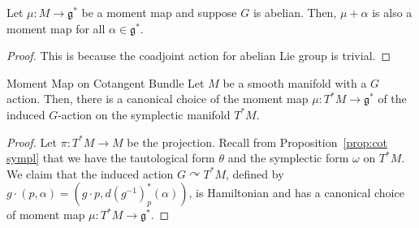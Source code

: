 \documentclass[b5paper,final]{article}
\newcommand{\acton}{\curvearrowright}
\begin{document}
\begin{lemma}{}
    Let $\mu : M \to \mathfrak{g}^*$ be a moment map and suppose $G$ is abelian. Then, $\mu + \alpha$ is also a moment map for all $\alpha \in \mathfrak{g}^*$.
    \begin{proof}
        This is because the coadjoint action for abelian Lie group is trivial.
    \end{proof}
\end{lemma}

\begin{proposition}{Moment Map on Cotangent Bundle}
    Let $M$ be a smooth manifold with a $G$ action. Then, there is a canonical choice of the moment map $\mu : T^*M \to \mathfrak{g}^*$ of the induced $G$-action on the symplectic manifold $T^*M$.
    \begin{proof}
        Let $\pi : T^*M \to M$ be the projection. Recall from Proposition~\ref{prop:cot sympl} that we have the tautological form $\theta$ and the symplectic form $\omega$ on $T^*M$. We claim that the induced action $G \acton T^*M$, defined by $g \cdot (p, \alpha) = (g \cdot p, d(g^{-1})_p^*(\alpha))$, is Hamiltonian and has a canonical choice of moment map $\mu : T^*M \to \mathfrak{g}^*$.
        

\end{proof}
\end{proposition}
\end{document}

